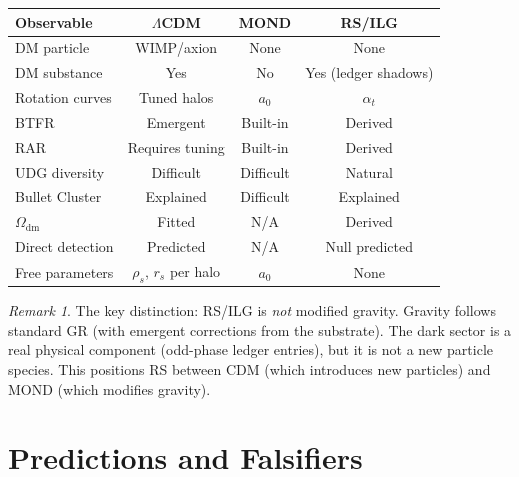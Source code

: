 \documentclass[12pt,a4paper]{article}
\theoremstyle{definition}
\theoremstyle{remark}
\newtheorem{remark}[theorem]{Remark}
\begin{document}
\begin{center}
\renewcommand{\arraystretch}{1.3}
\begin{tabular}{@{}lccc@{}}
\toprule
\textbf{Observable} & \textbf{$\Lambda$CDM} &
\textbf{MOND} & \textbf{RS/ILG} \\
\midrule
DM particle & WIMP/axion & None & None \\
DM substance & Yes & No & Yes (ledger shadows) \\
Rotation curves & Tuned halos & $a_0$ & $\alpha_t$ \\
BTFR & Emergent & Built-in & Derived \\
RAR & Requires tuning & Built-in & Derived \\
UDG diversity & Difficult & Difficult & Natural \\
Bullet Cluster & Explained & Difficult & Explained \\
$\Omega_{\mathrm{dm}}$ & Fitted & N/A & Derived \\
Direct detection & Predicted & N/A & Null predicted \\
Free parameters & $\rho_s$, $r_s$ per halo
& $a_0$ & None \\
\bottomrule
\end{tabular}
\end{center}

\begin{remark}
The key distinction: RS/ILG is \emph{not} modified gravity.
Gravity follows standard GR (with emergent corrections from
the substrate).  The dark sector is a real physical component
(odd-phase ledger entries), but it is not a new particle
species.  This positions RS between CDM (which introduces
new particles) and MOND (which modifies gravity).
\end{remark}

\section{Predictions and Falsifiers}
\label{sec:predictions}
\end{document}
